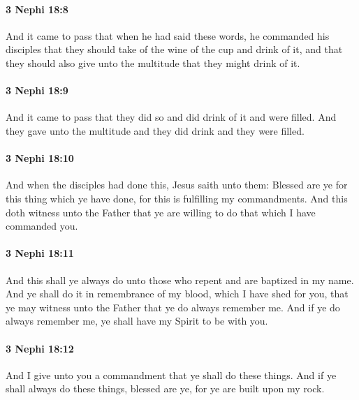 		\paragraph{3 Nephi 18:8} %
			\label{3NEPHI-18-8}

			And it came to pass that when he had said these words,
			he commanded his disciples
			that they should take of the wine of the cup and drink of it,
			and that they should also give unto the multitude that they might drink of it.

		\paragraph{3 Nephi 18:9} %
			\label{3NEPHI-18-9}

			And it came to pass that they did so and did drink of it and were filled.
			And they gave unto the multitude and they did drink and they were filled.

		\paragraph{3 Nephi 18:10} %
			\label{3NEPHI-18-10}

			And when the disciples had done this, Jesus saith unto them:
			Blessed are ye for this thing which ye have done,
			for this is fulfilling my commandments.
			And this doth witness unto the Father
			that ye are willing to do that which I have commanded you.

		\paragraph{3 Nephi 18:11} %
			\label{3NEPHI-18-11}

			And this shall ye always do unto those
			who repent and are baptized in my name.
			And ye shall do it in remembrance of my blood, which I have shed for you,
			that ye may witness unto the Father that ye do always remember me.
			And if ye do always remember me, ye shall have my Spirit to be with you.

		\paragraph{3 Nephi 18:12} %
			\label{3NEPHI-18-12}

			And I give unto you a commandment that ye shall do these things.
			And if ye shall always do these things, blessed are ye,
			for ye are built upon my rock.

